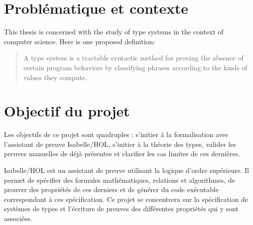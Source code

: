 \documentclass[letterpaper
, twoside
, 12pt
,these
,francais
,creativecommons,hyperref
]{thETS}
\begin{document}

\chapter{Problématique et contexte}


This thesis is concerned with the study of type systems in the context of computer science. Here is
one proposed definition:

\begin{quotation} %
  A type system is a tractable syntactic method for proving the absence of certain program behaviors
  by classifying phrases according to the kinds of values they compute.
\end{quotation}

\chapter{Objectif du projet}



Les objectifs de ce projet sont quadruples : s'initier à la formalisation avec l'assistant de preuve
Isabelle/HOL, s'initier à la théorie des types, valider les preuves manuelles de déjà présentes et
clarifier les cas limites de ces dernières.

Isabelle/HOL est un assistant de preuve utilisant la logique d'ordre supérieure. Il permet de
spécifier des formules mathématiques, relations et algorithmes, de prouver des propriétés de ces
derniers et de générer du code exécutable correspondant à ces spécification. Ce projet se
concentrera sur la spécification de systèmes de types et l'écriture de preuves des différentes
propriétés qui y sont associées.
\end{document}
